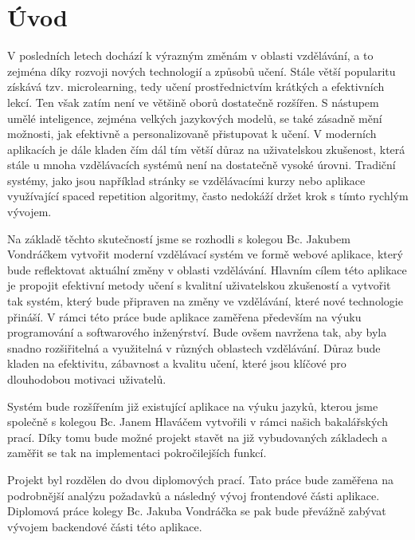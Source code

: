 \chapter*{Úvod}
\setcounter{page}{1}

V posledních letech dochází k výrazným změnám v oblasti vzdělávání, a to zejména díky rozvoji nových technologií a způsobů učení. Stále větší popularitu získává tzv. microlearning, tedy učení prostřednictvím krátkých a efektivních lekcí. Ten však zatím není ve většině oborů dostatečně rozšířen. S nástupem umělé inteligence, zejména velkých jazykových modelů, se také zásadně mění možnosti, jak efektivně a personalizovaně přistupovat k učení. V moderních aplikacích je dále kladen čím dál tím větší důraz na uživatelskou zkušenost, která stále u mnoha vzdělávacích systémů není na dostatečně vysoké úrovni. Tradiční systémy, jako jsou například stránky se vzdělávacími kurzy nebo aplikace využívající spaced repetition algoritmy, často nedokáží držet krok s tímto rychlým vývojem.

Na základě těchto skutečností jsme se rozhodli s kolegou Bc. Jakubem Vondráčkem vytvořit moderní vzdělávací systém ve formě webové aplikace, který bude reflektovat aktuální změny v oblasti vzdělávání. Hlavním cílem této aplikace je propojit efektivní metody učení s kvalitní uživatelskou zkušeností a vytvořit tak systém, který bude připraven na změny ve vzdělávání, které nové technologie přináší. V rámci této práce bude aplikace zaměřena především na výuku programování a softwarového inženýrství. Bude ovšem navržena tak, aby byla snadno rozšiřitelná a využitelná v různých oblastech vzdělávání. Důraz bude kladen na efektivitu, zábavnost a kvalitu učení, které jsou klíčové pro dlouhodobou motivaci uživatelů.

Systém bude rozšířením již existující aplikace na výuku jazyků, kterou jsme společně s kolegou Bc. Janem Hlaváčem vytvořili v rámci našich bakalářských prací. Díky tomu bude možné projekt stavět na již vybudovaných základech a zaměřit se tak na implementaci pokročilejších funkcí. \cite{Hlavac2024BachelorThesis} \cite{Jenicek2024BachelorThesis}

Projekt byl rozdělen do dvou diplomových prací. Tato práce bude zaměřena na podrobnější analýzu požadavků a následný vývoj frontendové části aplikace. Diplomová práce kolegy Bc. Jakuba Vondráčka se pak bude převážně zabývat vývojem backendové části této aplikace.

